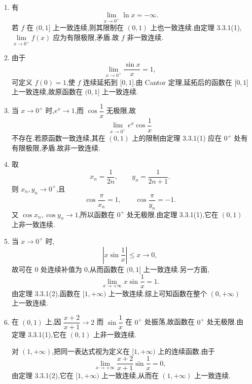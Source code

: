 \begin{solution}
    \leavevmode
    \begin{enumerate}
        \item 有
              \[
                  \lim\limits_{x\to0^+}\ln x=-\infty.
              \]
              若 $f$ 在 $(0,1\rbrack$ 上一致连续,则其限制在 $(0,1)$ 上也一致连续.由定理 3.3.1(1),$\displaystyle\lim\limits_{x\to0^+}f(x)$ 应为有限极限,矛盾.故 $f$ 非一致连续.

        \item 由于
              \[
                  \lim\limits_{x\to0^+}\dfrac{\sin x}{x}=1,
              \]
              可定义 $f(0)=1$,使 $f$ 连续延拓到 $\lbrack0,1\rbrack$.由 Cantor 定理,延拓后的函数在 $\lbrack0,1\rbrack$ 上一致连续,故原函数在 $(0,1\rbrack$ 上一致连续.

        \item 当 $x\to0^+$ 时,$e^x\to1$,而 $\cos\dfrac{1}{x}$ 无极限,故
              \[
                  \lim\limits_{x\to0^+}e^x\cos\dfrac{1}{x}
              \]
              不存在.若原函数一致连续,其在 $(0,1)$ 上的限制由定理 3.3.1(1) 应在 $0^+$ 处有有限极限,矛盾.故非一致连续.

        \item 取
              \[
                  x_n=\dfrac{1}{2n},
                  \qquad
                  y_n=\dfrac{1}{2n+1}.
              \]
              则 $x_n,y_n\to0^+$,且
              \[
                  \cos\dfrac{\pi}{x_n}=1,
                  \qquad
                  \cos\dfrac{\pi}{y_n}=-1.
              \]
              又 $\cos x_n,\cos y_n\to1$,所以函数在 $0^+$ 处无极限.由定理 3.3.1(1),它在 $(0,1)$ 上非一致连续.

        \item 当 $x\to0^+$ 时,
              \[
                  \left|x\sin\dfrac{1}{x}\right|\leq x\longrightarrow0,
              \]
              故可在 $0$ 处连续补值为 $0$,从而函数在 $(0,1\rbrack$ 上一致连续.另一方面,
              \[
                  \lim\limits_{x\to+\infty}x\sin\dfrac{1}{x}=1.
              \]
              由定理 3.3.1(2),函数在 $\lbrack1,+\infty)$ 上一致连续.综上可知函数在整个 $(0,+\infty)$ 上一致连续.

        \item 在 $(0,1)$ 上,因 $\dfrac{x+2}{x+1}\to2$ 而 $\sin\dfrac{1}{x}$ 在 $0^+$ 处振荡,故函数在 $0^+$ 处无极限.由定理 3.3.1(1),它在 $(0,1)$ 上非一致连续.

              对 $(1,+\infty)$,把同一表达式视为定义在 $\lbrack1,+\infty)$ 上的连续函数.由于
              \[
                  \lim\limits_{x\to+\infty}
                  \dfrac{x+2}{x+1}\sin\dfrac{1}{x}=0,
              \]
              由定理 3.3.1(2),它在 $\lbrack1,+\infty)$ 上一致连续,从而在 $(1,+\infty)$ 上一致连续.
    \end{enumerate}
\end{solution}

